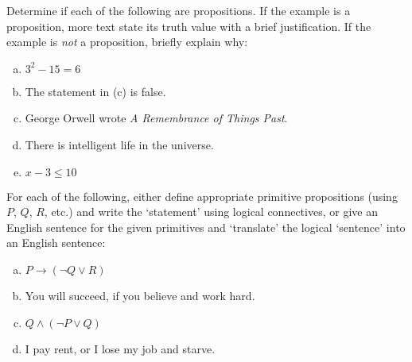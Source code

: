 \documentclass[11pt,letterpaper]{article}
\begin{document}






 Determine if each of the following are propositions. If the example is a proposition, more text state its truth value with a brief justification. If the example is \textit{not} a proposition, briefly explain why:
	\begin{enumerate}[(a)]
	\item $3^2 - 15= 6$
	\item The statement in (c) is false. 
	\item George Orwell wrote \textit{A Remembrance of Things Past}. 
	\item There is intelligent life in the universe.  
	\item $x - 3 \leq 10$
	\end{enumerate}




\newpage



 For each of the following, either define appropriate primitive propositions (using $P$, $Q$, $R$, etc.) and write the `statement' using logical connectives, or give an English sentence for the given primitives and `translate' the logical `sentence' into an English sentence:
	\begin{enumerate}[(a)]
	\item $P \to (\neg Q \vee R)$
	\item You will succeed, if you believe and work hard. 
	\item $Q \wedge (\neg P \vee Q)$
	\item I pay rent, or I lose my job and starve. 
	\end{enumerate}
\end{document}
